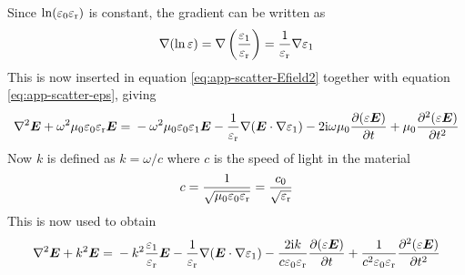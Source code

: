 \documentclass[11pt,twoside]{eitExjobb}
\begin{document}
	Since $\ln(\varepsilon_0 \varepsilon_{\mathrm{r}})$ is constant, the gradient can be written as
	\begin{equation*}
		\nabla(\ln{\varepsilon}) = \nabla \left( \frac{\varepsilon_1}{\varepsilon_{\mathrm{r}}} \right) = \frac{1}{\varepsilon_{\mathrm{r}}} \nabla \varepsilon_1
	\end{equation*}
	This is now inserted in equation \eqref{eq:app-scatter-Efield2} together with equation \eqref{eq:app-scatter-eps}, giving
	\begin{equation*}
		\nabla^2\bm{E} + \omega^2 \mu_0 \varepsilon_0 \varepsilon_{\mathrm{r}} \bm{E} = \\
		-\omega^2 \mu_0 \varepsilon_0 \varepsilon_1 \bm{E} -\frac{1}{\varepsilon_{\mathrm{r}}}\nabla(\bm{E} \cdot \nabla \varepsilon_1) - 2\mathrm{i} \omega \mu_0 \frac{\partial (\varepsilon \bm{E})}{\partial t} + \mu_0 \frac{\partial^2 (\varepsilon \bm{E})}{\partial t^2}
	\end{equation*}
	Now $k$ is defined as $k = \omega/c$ where $c$ is the speed of light in the material
	\begin{equation*}
		c = \frac{1}{\sqrt{\mu_0 \varepsilon_0 \varepsilon_{\mathrm{r}}}} = \frac{c_0}{\sqrt{\varepsilon_{\mathrm{r}}}}
	\end{equation*}
	This is now used to obtain
	\begin{equation*}
		\nabla^2\bm{E} + k^2 \bm{E} = \\
		-k^2 \frac{\varepsilon_1}{\varepsilon_{\mathrm{r}}} \bm{E} -\frac{1}{\varepsilon_{\mathrm{r}}}\nabla(\bm{E} \cdot \nabla \varepsilon_1) - \frac{2\mathrm{i} k}{c\varepsilon_0\varepsilon_{\mathrm{r}}} \frac{\partial (\varepsilon \bm{E})}{\partial t} + \frac{1}{c^2 \varepsilon_0 \varepsilon_{\mathrm{r}}} \frac{\partial^2 (\varepsilon \bm{E})}{\partial t^2}
	\end{equation*}
	
\end{document}
